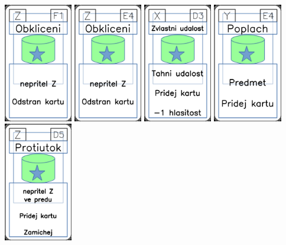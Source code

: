 \documentclass[a4paper]{article}
\begin{document}
	\includegraphics[width=3.0cm]{img-5_55}
	\includegraphics[width=3.0cm]{img-5_53}
	\includegraphics[width=3.0cm]{img-5_17}
	\includegraphics[width=3.0cm]{img-5_23}
	\includegraphics[width=3.0cm]{img-5_49}
\end{document}
